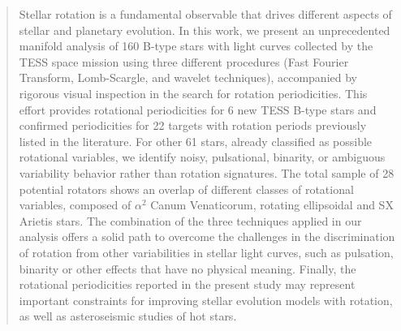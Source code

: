 \documentclass[RNAAS]{aastex63}
\begin{document}


\begin{abstract}

Stellar rotation is a fundamental observable that drives different aspects of stellar and planetary evolution. In this work, we present an unprecedented manifold analysis of 160 B-type stars with light curves collected by the TESS space mission using three different procedures (Fast Fourier Transform, Lomb-Scargle, and wavelet techniques), accompanied by rigorous visual inspection in the search for rotation periodicities. This effort provides rotational periodicities for 6 new TESS B-type stars and confirmed periodicities for 22 targets with rotation periods previously listed in the literature. For other 61 stars, already classified as possible rotational variables, we identify noisy, pulsational, binarity, or ambiguous variability behavior rather than rotation signatures. The total sample of 28 potential rotators shows an overlap of different classes of rotational variables, composed of $\alpha^2$ Canum Venaticorum, rotating ellipsoidal and SX Arietis stars. The combination of the three techniques applied in our analysis offers a solid path to overcome the challenges in the discrimination of rotation from other variabilities in stellar light curves, such as pulsation, binarity or other effects that have no physical meaning. Finally, the rotational periodicities reported in the present study may represent important constraints for improving stellar evolution  models with rotation, as well as asteroseismic studies of hot stars.

\end{abstract}

\end{document}
